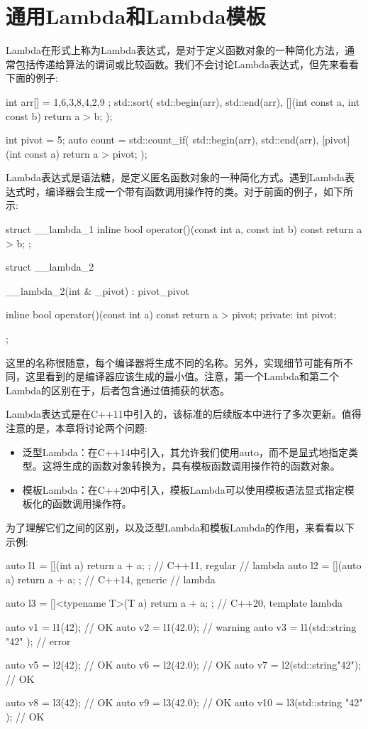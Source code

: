 \section{通用Lambda和Lambda模板}
Lambda在形式上称为Lambda表达式，是对于定义函数对象的一种简化方法，通常包括传递给算法的谓词或比较函数。我们不会讨论Lambda表达式，但先来看看下面的例子:

\begin{cpp}
int arr[] = { 1,6,3,8,4,2,9 };
std::sort(
	std::begin(arr), std::end(arr),
	[](int const a, int const b) {return a > b; });
	
int pivot = 5;
auto count = std::count_if(
	std::begin(arr), std::end(arr),
	[pivot](int const a) {return a > pivot; });
\end{cpp}

Lambda表达式是语法糖，是定义匿名函数对象的一种简化方式。遇到Lambda表达式时，编译器会生成一个带有函数调用操作符的类。对于前面的例子，如下所示:

\begin{cpp}
struct __lambda_1
{
	inline bool operator()(const int a, const int b) const
	{
		return a > b;
	}
};

struct __lambda_2
{
	__lambda_2(int & _pivot) : pivot{_pivot}
	{}
	
	inline bool operator()(const int a) const
	{
		return a > pivot;
	}
private:
	int pivot;
};
\end{cpp}

这里的名称很随意，每个编译器将生成不同的名称。另外，实现细节可能有所不同，这里看到的是编译器应该生成的最小值。注意，第一个Lambda和第二个Lambda的区别在于，后者包含通过值捕获的状态。

Lambda表达式是在C++11中引入的，该标准的后续版本中进行了多次更新。值得注意的是，本章将讨论两个问题:

\begin{itemize}
\item 
泛型Lambda：在C++14中引入，其允许我们使用auto，而不是显式地指定类型。这将生成的函数对象转换为，具有模板函数调用操作符的函数对象。

\item 
模板Lambda：在C++20中引入，模板Lambda可以使用模板语法显式指定模板化的函数调用操作符。
\end{itemize}

为了理解它们之间的区别，以及泛型Lambda和模板Lambda的作用，来看看以下示例:

\begin{cpp}
auto l1 = [](int a) {return a + a; }; // C++11, regular
                                      // lambda
auto l2 = [](auto a) {return a + a; }; // C++14, generic
                                       // lambda
                                       
auto l3 = []<typename T>(T a)
          { return a + a; }; // C++20, template lambda

auto v1 = l1(42); // OK
auto v2 = l1(42.0); // warning
auto v3 = l1(std::string{ "42" }); // error

auto v5 = l2(42); // OK
auto v6 = l2(42.0); // OK
auto v7 = l2(std::string{"42"}); // OK

auto v8 = l3(42); // OK
auto v9 = l3(42.0); // OK
auto v10 = l3(std::string{ "42" }); // OK
\end{cpp}


